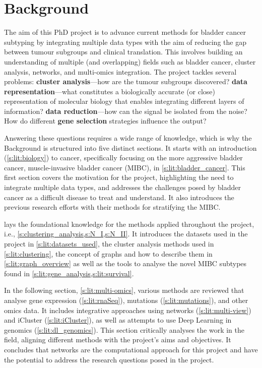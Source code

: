 

\chapter{Background} \label{s:lit_review_intro}


The aim of this PhD project is to advance current methods for bladder cancer subtyping by integrating multiple data types with the aim of reducing the gap between tumour subgroups and clinical translation. This involves building an understanding of multiple (and overlapping) fields such as bladder cancer, cluster analysis, networks, and multi-omics integration. The project tackles several problems: \textbf{cluster analysis}—how are the tumour subgroups discovered? \textbf{data representation}—what constitutes a biologically accurate (or close) representation of molecular biology that enables integrating different layers of information? \textbf{data reduction}—how can the signal be isolated from the noise? How do different \textbf{gene selection} strategies influence the output?

Answering these questions requires a wide range of knowledge, which is why the Background is structured into five distinct sections. It starts with an introduction (\cref{s:lit:biology}) to cancer, specifically focusing on the more aggressive bladder cancer, muscle-invasive bladder cancer (MIBC), in \cref{s:lit:bladder_cancer}. This first section covers the motivation for the project, highlighting the need to integrate multiple data types, and addresses the challenges posed by bladder cancer as a difficult disease to treat and understand. It also introduces the previous research efforts with their methods for stratifying the MIBC.

 lays the foundational knowledge for the methods applied throughout the project, i.e., \cref{s:clustering_analysis,s:N_I,s:N_II}. It introduces the datasets used in the project in \cref{s:lit:datasets_used}, the cluster analysis methods used in \cref{s:lit:clustering}, the concept of graphs and how to describe them in \cref{s:lit:graph_overview} as well as the tools to analyse the novel MIBC subtypes found in \cref{s:lit:gene_analysis,s:lit:survival}. 


In the following section, \ref{s:lit:multi-omics}, various methods are reviewed that analyse gene expression (\cref{s:lit:rnaSeq}), mutations (\cref{s:lit:mutations}), and other omics data. It includes integrative approaches using networks (\cref{s:lit:multi-view}) and iCluster (\cref{s:lit:iCluster}), as well as attempts to use Deep Learning in genomics (\cref{s:lit:dl_genomics}). This section critically analyses the work in the field, aligning different methods with the project's aims and objectives. It concludes that networks are the computational approach for this project and have the potential to address the research questions posed in the project.

